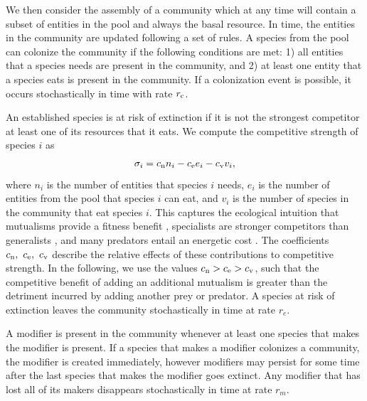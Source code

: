 \documentclass[twocolumn,preprintnumbers,amsmath,amssymb,superscriptaddress,linenumbers]{revtex4-1}
\newcommand{\rr}[1]{{\rm #1}}
\begin{document}
{  We then consider the assembly of a community which at any time will contain a subset of entities in the pool and always the basal resource.
  In time, the entities in the community are updated following a set of rules.
  A species from the pool can colonize the community if the following conditions are met:
  1) all entities that a species needs are present in the community, and
  2) at least one entity that a species eats is present in the community.
  If a colonization event is possible, it occurs stochastically in time with rate $r_\rr{c}$.

  An established species is at risk of extinction if it is not the strongest competitor at least one of its resources that it eats.
  We compute the competitive strength of species $i$ as
  \begin{equation}
    \sigma_i = c_\rr{n} n_i - c_\rr{e} e_i - c_\rr{v} v_i,
  \end{equation}
  where $n_i$ is the number of entities that species $i$ needs, $e_i$ is the number of entities from the pool that species $i$ can eat, and $v_i$ is the number of species in the community that eat species $i$.
  This captures the ecological intuition that mutualisms provide a fitness benefit \cite{Bronstein1994}, specialists are stronger competitors than generalists \cite{Futuyma1988}, and many predators entail an energetic cost \cite{Brown1994}.
  The coefficients $c_\rr{n},~c_\rr{e},~c_\rr{v}$ describe the relative effects of these contributions to competitive strength.
  In the following, we use the values $c_\rr{n} > c_\rr{e} > c_\rr{v}$, such that the competitive benefit of adding an additional mutualism is greater than the detriment incurred by adding another prey or predator.
  A species at risk of extinction leaves the community stochastically in time at rate $r_e$.

  A modifier is present in the community whenever at least one species that makes the modifier is present.
  If a species that makes a modifier colonizes a community, the modifier is created immediately, however modifiers may persist for some time after the last species that makes the modifier goes extinct.
  Any modifier that has lost all of its makers disappears stochastically in time at rate $r_m$.

}
\end{document}

